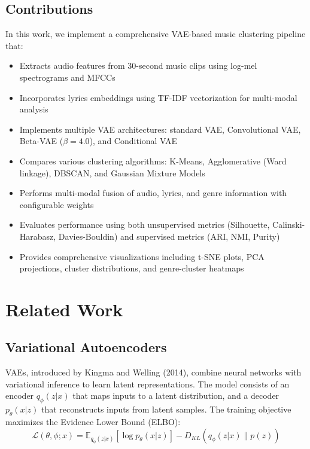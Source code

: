 \documentclass{article}
\begin{document}
\subsection{Contributions}

In this work, we implement a comprehensive VAE-based music clustering pipeline that:
\begin{itemize}
    \item Extracts audio features from 30-second music clips using log-mel spectrograms and MFCCs
    \item Incorporates lyrics embeddings using TF-IDF vectorization for multi-modal analysis
    \item Implements multiple VAE architectures: standard VAE, Convolutional VAE, Beta-VAE ($\beta=4.0$), and Conditional VAE
    \item Compares various clustering algorithms: K-Means, Agglomerative (Ward linkage), DBSCAN, and Gaussian Mixture Models
    \item Performs multi-modal fusion of audio, lyrics, and genre information with configurable weights
    \item Evaluates performance using both unsupervised metrics (Silhouette, Calinski-Harabasz, Davies-Bouldin) and supervised metrics (ARI, NMI, Purity)
    \item Provides comprehensive visualizations including t-SNE plots, PCA projections, cluster distributions, and genre-cluster heatmaps
\end{itemize}

\section{Related Work}

\subsection{Variational Autoencoders}
VAEs, introduced by Kingma and Welling (2014), combine neural networks with variational inference to learn latent representations. The model consists of an encoder $q_\phi(z|x)$ that maps inputs to a latent distribution, and a decoder $p_\theta(x|z)$ that reconstructs inputs from latent samples. The training objective maximizes the Evidence Lower Bound (ELBO):
\begin{equation}
\mathcal{L}(\theta, \phi; x) = \mathbb{E}_{q_\phi(z|x)}[\log p_\theta(x|z)] - D_{KL}(q_\phi(z|x) \| p(z))
\end{equation}
\end{document}
